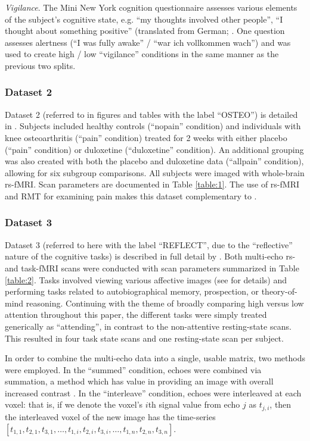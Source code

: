\documentclass[12pt]{spieman}  %
\begin{document}
\begin{spacing}{2}
\emph{Vigilance}.
The Mini New York cognition questionnaire assesses various elements of the subject's cognitive
state, e.g. ``my thoughts involved other people'', ``I thought about something positive'' (translated
from German; \cite{gorgolewskiCorrespondenceIndividualDifferences2014}. One question assesses
alertness (``I was fully awake'' / ``war ich vollkommen wach'') and was used to create high / low
``vigilance'' conditions in the same manner as the previous two splits.

\subsubsection{Dataset 2}
Dataset 2 (referred to in figures and tables with the label ``OSTEO'') is detailed in
\cite{tetreaultBrainConnectivityPredicts2016}. Subjects included healthy controls (``nopain''
condition) and individuals with knee osteoarthritis (``pain'' condition) treated for 2 weeks with
either placebo (``pain'' condition) or duloxetine (``duloxetine'' condition). An additional grouping was
also created with both the placebo and duloxetine data (``allpain'' condition), allowing for six
subgroup comparisons. All subjects were imaged with whole-brain rs-fMRI. Scan parameters are
documented in Table \ref{table:1}. The use of rs-fMRI and RMT for examining pain makes this dataset
complementary to \cite{matharooSpontaneousBackpainAlters2020}.

\subsubsection{Dataset 3}
Dataset 3  (referred to here with the label ``REFLECT'', due to the ``reflective” nature of the
cognitive tasks) is described in full detail by \cite{dupreMultiechoFMRIReplication2016}. Both
multi-echo rs- and task-fMRI scans were conducted with scan parameters summarized in Table \ref{table:2}. Tasks
involved viewing various affective images (see \cite{sprengPatternsBrainActivity2010} for details)
and performing tasks related to autobiographical memory, prospection, or theory-of-mind reasoning.
Continuing with the theme of broadly comparing high versus low attention throughout this paper, the
different tasks were simply treated generically as ``attending'', in contrast to the non-attentive
resting-state scans. This resulted in four task state scans and one resting-state scan per subject.

In order to combine the multi-echo data into a single, usable matrix, two methods were employed. In
the ``summed'' condition, echoes were combined via summation, a method which has value in providing an
image with overall increased contrast \cite{kunduMultiechoFMRIReview2017}. In the ``interleave''
condition, echoes were interleaved at each voxel: that is, if we denote the voxel's \(i\)th signal value
from echo \(j\) as \(t_{j,i}\), then the interleaved voxel of the new image has the time-series \([t_{1,1},
t_{2,1}, t_{3,1}, \dots, t_{1,i}, t_{2,i}, t_{3,i}, \dots, t_{1,n}, t_{2,n}, t_{3,n}]\).


\end{spacing}
\end{document}
